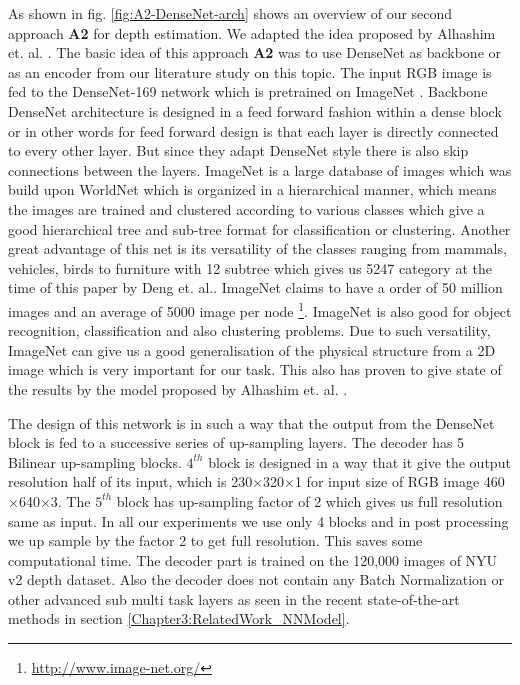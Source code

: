 As shown in fig. \ref{fig:A2-DenseNet-arch} shows an overview of our second approach \textbf{A2} for depth estimation. We adapted the idea proposed by Alhashim et. al. \cite{Alhashim2018}. The basic idea of this approach \textbf{A2} was to use DenseNet as backbone or as an encoder from our literature study on this topic. The input RGB image is fed to the DenseNet-169 \cite{huang2017densely} network which is pretrained on ImageNet \cite{deng2009imagenet}.  Backbone DenseNet architecture is designed in a feed forward fashion within a dense block or in other words for feed forward design is that each layer is directly connected to every other layer. But since they adapt DenseNet style there is also skip connections between the layers. ImageNet is a large database of images which was build upon WorldNet which is organized in a hierarchical manner, which means the images are trained and clustered according to various classes which give a good hierarchical tree and sub-tree format for classification or clustering. Another great advantage of this net is its versatility of the classes ranging from mammals, vehicles, birds to furniture with 12 subtree which gives us 5247 category at the time of this paper by Deng et. al.\cite{deng2009imagenet}. ImageNet claims to have a order of 50 million images and an average of 5000 image per node \footnote{\url{http://www.image-net.org/}}. ImageNet is also good for object recognition, classification and also clustering problems. Due to such versatility, ImageNet can give us a good generalisation of the physical structure from a 2D image which is very important for our task. This also has proven to give state of the results by the model proposed by Alhashim et. al. \cite{Alhashim2018}. 


The design of this network is in such a way that the output from the DenseNet block is  fed to a successive series of up-sampling layers. The decoder has 5 Bilinear up-sampling blocks. \(4^{th}\) block is designed in a way that it give the output resolution half of its input, which is 230$\times$320$\times$1 for input size of RGB image 460$\times$640$\times$3. The \(5^{th}\) block has up-sampling factor of 2 which gives us full resolution same as input. In all our experiments we use only 4 blocks and in post processing we up sample by the factor 2 to get full resolution. This saves some computational time. The decoder part is trained on the 120,000 images of NYU v2 depth dataset. Also the decoder does not contain any Batch Normalization or other advanced sub multi task layers as seen in the recent state-of-the-art methods in section \ref{Chapter3:RelatedWork_NNModel}.

